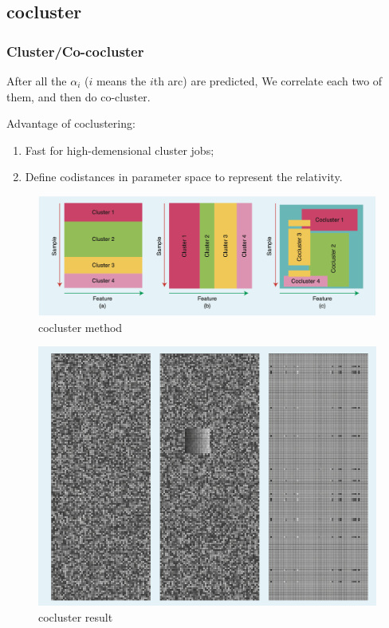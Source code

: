 \documentclass[aspectratio=169]{beamer}
\begin{document}
    \subsection{cocluster}
    \begin{frame}[allowframebreaks]
        \frametitle{Cluster/Co-cocluster}
    
        After all the $\alpha_i$ ($i$ means the $i$th arc) are predicted,
        We correlate each two of them, and then do co-cluster.

        Advantage of coclustering:
        \begin{enumerate}
            \item Fast for high-demensional cluster jobs;
            \item Define codistances in parameter space to represent the relativity.
        \end{enumerate}
        \framebreak

        \begin{figure}
            \includegraphics[width=0.8\linewidth]{pic/cocluster.png}
            \caption{cocluster method}
        \end{figure}
        \begin{figure}
            \includegraphics[width=0.5\linewidth]{pic/cocluster2.png}
            \caption{cocluster result}
        \end{figure}

    
    \end{frame}
\end{document}
